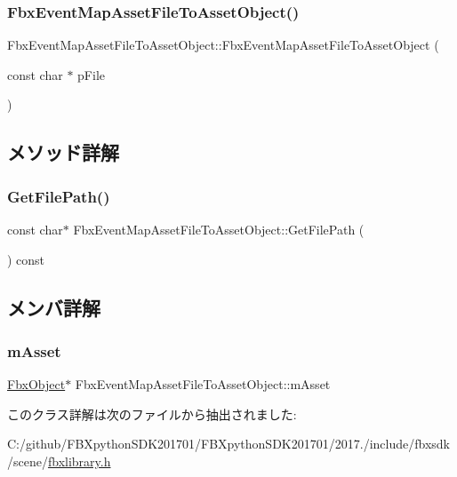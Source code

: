 \subsubsection{\texorpdfstring{Fbx\+Event\+Map\+Asset\+File\+To\+Asset\+Object()}{FbxEventMapAssetFileToAssetObject()}}
{\footnotesize\ttfamily Fbx\+Event\+Map\+Asset\+File\+To\+Asset\+Object\+::\+Fbx\+Event\+Map\+Asset\+File\+To\+Asset\+Object (\begin{DoxyParamCaption}\item[{const char $\ast$}]{p\+File }\end{DoxyParamCaption})}



\subsection{メソッド詳解}
\mbox{\label{class_fbx_event_map_asset_file_to_asset_object_a52c6658860c2ee9d3c5fb74d82ad003e}} 
\subsubsection{\texorpdfstring{Get\+File\+Path()}{GetFilePath()}}
{\footnotesize\ttfamily const char$\ast$ Fbx\+Event\+Map\+Asset\+File\+To\+Asset\+Object\+::\+Get\+File\+Path (\begin{DoxyParamCaption}{ }\end{DoxyParamCaption}) const}



\subsection{メンバ詳解}
\mbox{\label{class_fbx_event_map_asset_file_to_asset_object_a29d3b4f66df038ce5fbf3832a3cd3f31}} 
\subsubsection{\texorpdfstring{m\+Asset}{mAsset}}
{\footnotesize\ttfamily \hyperlink{class_fbx_object}{Fbx\+Object}$\ast$ Fbx\+Event\+Map\+Asset\+File\+To\+Asset\+Object\+::m\+Asset\hspace{0.3cm}{\ttfamily [mutable]}}



このクラス詳解は次のファイルから抽出されました\+:\begin{DoxyCompactItemize}
\item 
C\+:/github/\+F\+B\+Xpython\+S\+D\+K201701/\+F\+B\+Xpython\+S\+D\+K201701/2017./include/fbxsdk/scene/\hyperlink{fbxlibrary_8h}{fbxlibrary.\+h}\end{DoxyCompactItemize}
